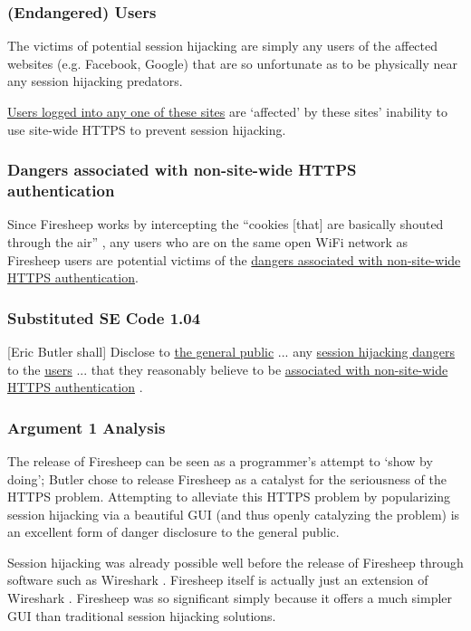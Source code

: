 \documentclass[11pt]{article}
\begin{document}
\begin{multicols}{2}
\subsubsection{(Endangered) Users}
The victims of potential session hijacking are simply any users of the affected websites (e.g. Facebook, Google) that are so unfortunate as to be physically near any session hijacking predators.

\uline{Users logged into any one of these sites} are `affected' by these sites' inability to use site-wide HTTPS to prevent session hijacking.

\subsubsection{Dangers associated with non-site-wide HTTPS authentication}
Since Firesheep works by intercepting the ``cookies [that] are basically shouted through the air'' \cite{eric-butler}, any users who are on the same open WiFi network as Firesheep users are potential victims of the \uline{dangers associated with non-site-wide HTTPS authentication}.

\subsubsection{Substituted SE Code 1.04}
[Eric Butler shall] Disclose to \uline{the general public} ... any \uline{session hijacking dangers} to the \uline{users} ... that they reasonably believe to be \uline{associated with non-site-wide HTTPS authentication} \cite{se-code}. 

\subsubsection{Argument 1 Analysis}
The release of Firesheep can be seen as a programmer's attempt to `show by doing'; Butler chose to release Firesheep as a catalyst for the seriousness of the HTTPS problem. Attempting to alleviate this HTTPS problem by popularizing session hijacking via a beautiful GUI (and thus openly catalyzing the problem) is an excellent form of danger disclosure to the general public.

Session hijacking was already possible well before the release of Firesheep through software such as Wireshark \cite{wireshark}. Firesheep itself is actually just an extension of Wireshark \cite{firesheep-source}. Firesheep was so significant simply because it offers a much simpler GUI than traditional session hijacking solutions. 


\end{multicols}
\end{document}
